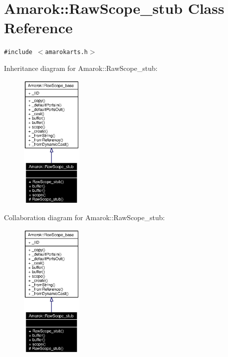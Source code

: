 \section{Amarok::Raw\-Scope\_\-stub Class Reference}
\label{classAmarok_1_1RawScope__stub}
{\tt \#include $<$amarokarts.h$>$}

Inheritance diagram for Amarok::Raw\-Scope\_\-stub:\begin{figure}[H]
\begin{center}
\leavevmode
\includegraphics[width=84pt]{classAmarok_1_1RawScope__stub__inherit__graph}
\end{center}
\end{figure}
Collaboration diagram for Amarok::Raw\-Scope\_\-stub:\begin{figure}[H]
\begin{center}
\leavevmode
\includegraphics[width=84pt]{classAmarok_1_1RawScope__stub__coll__graph}
\end{center}
\end{figure}
